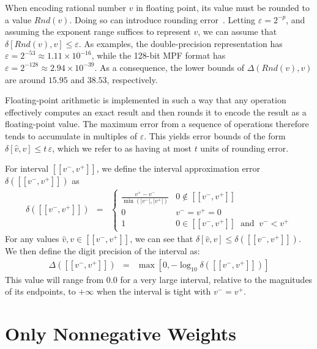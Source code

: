 \documentclass[letterpaper,USenglish,cleveref, autoref, thm-restate]{lipics-v2021}
\newcommand{\approximate}[1]{\hat{#1}}
\newcommand{\approxv}{\approximate{v}}
\newcommand{\round}{\mathit{Rnd}}
\newcommand{\aerror}{\delta}
\newcommand{\digitprecision}{\Delta}
\newcommand{\roundepsilon}{\varepsilon}
\newcommand{\vmin}{v^{-}}
\newcommand{\vmax}{v^{+}}
\newcommand{\interval}[1]{[\![#1]\!]}
\begin{document}
When encoding rational number $v$ in floating point, its value must be rounded to a
value $\round(v)$.  Doing so can introduce rounding
error~\cite{knuth:fp:1981,muller:hfpa:2018}.  
Letting $\roundepsilon = 2^{-p}$, and assuming 
the exponent range suffices to represent $v$,
we can assume that
$\aerror[\round(v), v] \leq \roundepsilon$.
As examples, the double-precision representation has $\roundepsilon = 2^{-53} \approx 1.11 \times 10^{-16}$, while the 128-bit MPF format
has $\roundepsilon = 2^{-128} \approx 2.94 \times 10^{-39}$.  As a consequence, the lower bounds of $\digitprecision(\round(v), v)$ are around $15.95$ and $38.53$, respectively.

Floating-point arithmetic is implemented in such a way that any
operation effectively computes an exact result and then rounds it to
encode the result as a floating-point value.  The maximum error from a sequence of operations
therefore tends to accumulate in multiples of $\roundepsilon$.
This yields error bounds of the form $\aerror[\approxv, v] \leq t\,\roundepsilon$,
which we  refer to as having at most $t$ units of
rounding error.

For interval $\interval{\vmin, \vmax}$, we define the interval approximation error $\aerror(\interval{\vmin, \vmax})$ as
\begin{eqnarray}
\aerror(\interval{\vmin, \vmax}) & = & \left\{ \begin{array}{ll}
  \frac{\vmax - \vmin}{\min(|\vmin|, |\vmax|)}  & 0 \not \in \interval{\vmin, \vmax}\\[0.8em]
  0 & \vmin = \vmax = 0 \\
  1 & 0 \in \interval{\vmin, \vmax} \;\; \textrm{and} \;\; \vmin < \vmax
  \end{array} \right. \label{eqn:interval:error}
\end{eqnarray}
For any values $\approxv, v \in \interval{\vmin, \vmax}$, we can see that
$\aerror[\approxv, v] \leq \aerror(\interval{\vmin, \vmax})$.
We then define the digit precision of the interval as:
\begin{eqnarray}
\digitprecision(\interval{\vmin, \vmax}) & = & \max[0, -\log_{10} \aerror(\interval{\vmin, \vmax})] \label{eqn:interval:digitprecision} 
\end{eqnarray}
This value will range from $0.0$ for a very large interval, relative to the magnitudes of its endpoints, to $+\infty$ when the interval is tight with $\vmin = \vmax$.

\section{Only Nonnegative Weights}
\label{sect:nonneg}
\end{document}
